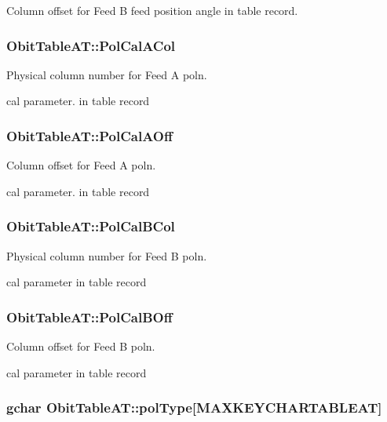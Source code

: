 Column offset for Feed B feed position angle in table record. 

\subsubsection{ {\bf Obit\-Table\-AT::Pol\-Cal\-ACol}}\label{structObitTableAT_o47}


Physical column number for Feed A poln. 

cal parameter. in table record 
\subsubsection{ {\bf Obit\-Table\-AT::Pol\-Cal\-AOff}}\label{structObitTableAT_o46}


Column offset for Feed A poln. 

cal parameter. in table record 
\subsubsection{ {\bf Obit\-Table\-AT::Pol\-Cal\-BCol}}\label{structObitTableAT_o51}


Physical column number for Feed B poln. 

cal parameter in table record 
\subsubsection{ {\bf Obit\-Table\-AT::Pol\-Cal\-BOff}}\label{structObitTableAT_o50}


Column offset for Feed B poln. 

cal parameter in table record 
\subsubsection{\setlength{\rightskip}{0pt plus 5cm}gchar {\bf Obit\-Table\-AT::pol\-Type}[MAXKEYCHARTABLEAT]}\label{structObitTableAT_o26}


